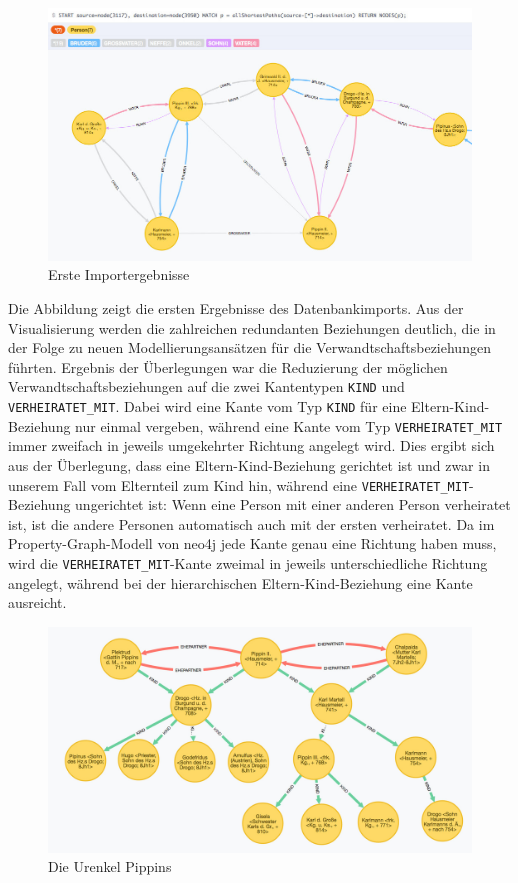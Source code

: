 \documentclass[ngerman,]{scrreprt}
\begin{document}
\begin{figure}
\centering
\includegraphics{Bilder/NeG/020-Verwandschaften.jpg}
\caption{Erste Importergebnisse}
\end{figure}

Die Abbildung zeigt die ersten Ergebnisse des Datenbankimports. Aus der Visualisierung werden die zahlreichen redundanten Beziehungen deutlich, die in der Folge zu neuen Modellierungsansätzen für die Verwandtschaftsbeziehungen führten. Ergebnis der Überlegungen war die Reduzierung der möglichen Verwandtschaftsbeziehungen auf die zwei Kantentypen \texttt{KIND} und \texttt{VERHEIRATET\_MIT}. Dabei wird eine Kante vom Typ \texttt{KIND} für eine Eltern-Kind-Beziehung nur einmal vergeben, während eine Kante vom Typ \texttt{VERHEIRATET\_MIT} immer zweifach in jeweils umgekehrter Richtung angelegt wird. Dies ergibt sich aus der Überlegung, dass eine Eltern-Kind-Beziehung gerichtet ist und zwar in unserem Fall vom Elternteil zum Kind hin, während eine \texttt{VERHEIRATET\_MIT}-Beziehung ungerichtet ist: Wenn eine Person mit einer anderen Person verheiratet ist, ist die andere Personen automatisch auch mit der ersten verheiratet. Da im Property-Graph-Modell von neo4j jede Kante genau eine Richtung haben muss, wird die \texttt{VERHEIRATET\_MIT}-Kante zweimal in jeweils unterschiedliche Richtung angelegt, während bei der hierarchischen Eltern-Kind-Beziehung eine Kante ausreicht.

\begin{figure}
\centering
\includegraphics{Bilder/NeG/030-Urenkel-Pippins.jpg}
\caption{Die Urenkel Pippins}
\end{figure}
\end{document}
